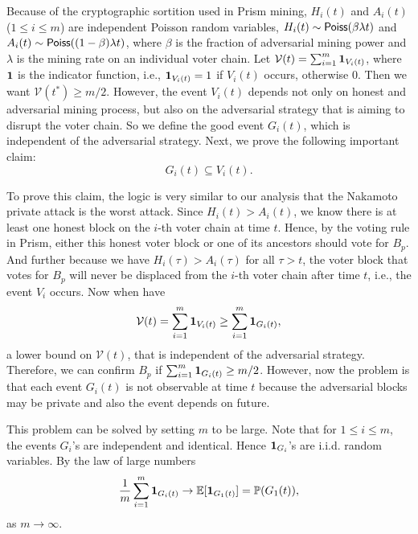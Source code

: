\documentclass{article}
\newcommand{\indicator}{{\bf 1}}
\begin{document}
Because of the cryptographic sortition used in {\sf Prism} mining, $H_i(t)$ and $A_i(t)$ ($1 \leq i \leq m$) are independent Poisson random variables, $H_i(t) \sim {\sf Poiss}(\beta\lambda t)$ and $A_i(t) \sim {\sf Poiss}((1-\beta)\lambda t)$, where $\beta$ is the fraction of adversarial mining power and $\lambda$ is the mining rate on an individual voter chain. Let $\mathcal{V}(t) = \sum_{i=1}^m \indicator_{V_i(t)}$, where $\indicator$ is the indicator function, i.e., $\indicator_{V_i(t)} = 1$ if $V_i(t)$ occurs, otherwise 0. Then we want $\mathcal{V}(t^*) \geq m/2$. However, the event $V_i(t)$ depends not only on honest and adversarial mining process, but also on the adversarial strategy that is aiming to disrupt the voter chain. So we define the good event $G_i(t)$, which is independent of the adversarial strategy. Next, we prove the following important claim:
$$G_i(t) \subseteq V_i(t).$$

To prove this claim, the logic is very similar to our analysis that the Nakamoto private attack is the worst attack. Since $H_i(t) > A_i(t)$, we know there is at least one honest block on the $i$-th voter chain at time $t$. Hence, by the voting rule in {\sf Prism}, either this honest voter block or one of its ancestors should vote for $B_p$. And further because we have $H_i(\tau) > A_i(\tau)$ for all $\tau > t$, the voter block that votes for $B_p$ will never be displaced from the $i$-th voter chain after time $t$, i.e., the event $V_i$ occurs. Now when have
\begin{equation}
\label{eqn:bound}
    \mathcal{V}(t) = \sum_{i=1}^m \indicator_{V_i(t)} \geq \sum_{i=1}^m \indicator_{G_i(t)},
\end{equation}
a lower bound on $\mathcal{V}(t)$, that is independent of the adversarial strategy. Therefore, we can confirm $B_p$ if $\sum_{i=1}^m \indicator_{G_i(t)} \geq m/2$. However, now the problem is that each event $G_i(t)$ is not observable at time $t$ because the adversarial blocks may be private and also the event depends on future. 

This problem can be solved by setting $m$ to be large. Note that for $1 \leq i \leq m$, the events $G_i$'s are independent and identical. Hence $\indicator_{G_i}$'s are i.i.d. random variables. By the law of large numbers
\begin{equation}
\label{eqn:lln}
    \frac{1}{m} \sum_{i=1}^m \indicator_{G_i(t)} \rightarrow \mathbb{E}[ \indicator_{G_1(t)}] = \mathbb{P}(G_1(t)),
\end{equation}
as $m \rightarrow \infty$.
\end{document}
